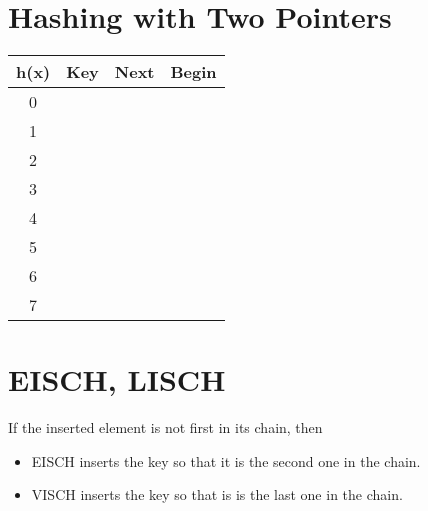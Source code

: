 \section*{Hashing with Two Pointers}
\begin{tabular}{|c|c|c|c|}
\hline
h(x) & Key & Next & Begin \\ \hline\hline
0 & \hspace{3cm} & \hspace{3cm} & \hspace{3cm} \\ \hline
1 & \hspace{3cm} & \hspace{3cm} & \hspace{3cm} \\ \hline
2 & \hspace{3cm} & \hspace{3cm} & \hspace{3cm} \\ \hline
3 & \hspace{3cm} & \hspace{3cm} & \hspace{3cm} \\ \hline
4 & \hspace{3cm} & \hspace{3cm} & \hspace{3cm} \\ \hline
5 & \hspace{3cm} & \hspace{3cm} & \hspace{3cm} \\ \hline
6 & \hspace{3cm} & \hspace{3cm} & \hspace{3cm} \\ \hline
7 & \hspace{3cm} & \hspace{3cm} & \hspace{3cm} \\ \hline
\end{tabular}

\section*{EISCH, LISCH}
If the inserted element is not first in its chain, then 
\begin{itemize}
\item EISCH inserts the key so that it is the second one in the chain.
\item VISCH inserts the key so that is is the last one in the chain.
\end{itemize}

